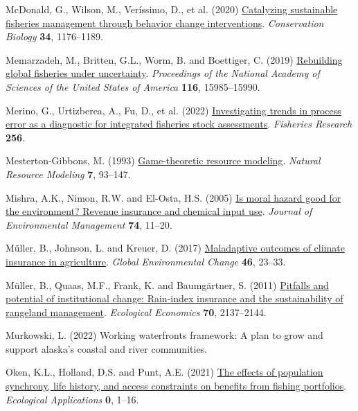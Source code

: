 \documentclass[
  letterpaper,
  DIV=11,
  numbers=noendperiod]{scrartcl}
\newlength{\cslhangindent}
\newlength{\cslentryspacingunit} %
\newenvironment{CSLReferences}[2] %
 {%
  \setlength{\parindent}{0pt}
  \ifodd #1
  \let\oldpar\par
  \def\par{\hangindent=\cslhangindent\oldpar}
  \fi
  \setlength{\parskip}{#2\cslentryspacingunit}
 }%
 {}
\theoremstyle{plain}
\theoremstyle{plain}
\theoremstyle{remark}
\begin{document}
\begin{CSLReferences}{1}{0}
\leavevmode{}%
McDonald, G., Wilson, M., Veríssimo, D., et al. (2020)
\href{https://doi.org/10.1111/cobi.13475}{Catalyzing sustainable
fisheries management through behavior change interventions}.
\emph{Conservation Biology} \textbf{34}, 1176--1189.

\leavevmode{}%
Memarzadeh, M., Britten, G.L., Worm, B. and Boettiger, C. (2019)
\href{https://doi.org/10.1073/pnas.1902657116}{Rebuilding global
fisheries under uncertainty}. \emph{Proceedings of the National Academy
of Sciences of the United States of America} \textbf{116}, 15985--15990.

\leavevmode{}%
Merino, G., Urtizberea, A., Fu, D., et al. (2022)
\href{https://doi.org/10.1016/j.fishres.2022.106478}{Investigating
trends in process error as a diagnostic for integrated fisheries stock
assessments}. \emph{Fisheries Research} \textbf{256}.

\leavevmode{}%
Mesterton-Gibbons, M. (1993)
\href{https://doi.org/10.1111/j.1939-7445.1993.tb00143.x}{Game-theoretic
resource modeling}. \emph{Natural Resource Modeling} \textbf{7},
93--147.

\leavevmode{}%
Mishra, A.K., Nimon, R.W. and El-Osta, H.S. (2005)
\href{https://doi.org/10.1016/j.jenvman.2004.08.003}{Is moral hazard
good for the environment? Revenue insurance and chemical input use}.
\emph{Journal of Environmental Management} \textbf{74}, 11--20.

\leavevmode{}%
Müller, B., Johnson, L. and Kreuer, D. (2017)
\href{https://doi.org/10.1016/j.gloenvcha.2017.06.010}{Maladaptive
outcomes of climate insurance in agriculture}. \emph{Global
Environmental Change} \textbf{46}, 23--33.

\leavevmode{}%
Müller, B., Quaas, M.F., Frank, K. and Baumgärtner, S. (2011)
\href{https://doi.org/10.1016/j.ecolecon.2011.06.011}{Pitfalls and
potential of institutional change: Rain-index insurance and the
sustainability of rangeland management}. \emph{Ecological Economics}
\textbf{70}, 2137--2144.

\leavevmode{}%
Murkowski, L. (2022) Working waterfronts framework: A plan to grow and
support alaska's coastal and river communities.

\leavevmode{}%
Oken, K.L., Holland, D.S. and Punt, A.E. (2021)
\href{https://doi.org/10.1002/eap.2307}{The effects of population
synchrony, life history, and access constraints on benefits from fishing
portfolios}. \emph{Ecological Applications} \textbf{0}, 1--16.


\end{CSLReferences}
\end{document}
